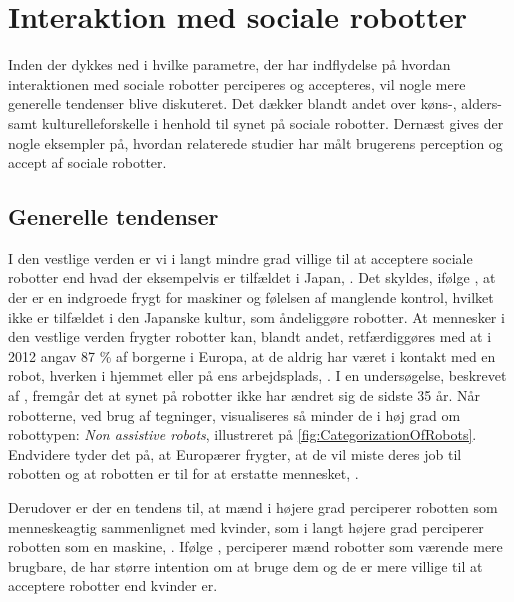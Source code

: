 \section{Interaktion med sociale robotter}
\label{InteraktionSocialeRobotter}
%
Inden der dykkes ned i hvilke parametre, der har indflydelse på hvordan interaktionen med sociale robotter perciperes og accepteres, vil nogle mere generelle tendenser blive diskuteret. Det dækker blandt andet over køns-, alders- samt kulturelleforskelle i henhold til synet på sociale robotter. Dernæst gives der nogle eksempler på, hvordan relaterede studier har målt brugerens perception og accept af sociale robotter.
%
\subsection{Generelle tendenser}
\label{InteraktionSocialeRobotterGenerelleTendenser}
%
I den vestlige verden er vi i langt mindre grad villige til at acceptere sociale robotter end hvad der eksempelvis er tilfældet i Japan, \parencite[s. 28]{PDF:InTheCompanyofRobots}. Det skyldes, ifølge \textcite[s. 28]{PDF:InTheCompanyofRobots}, at der er en indgroede frygt for maskiner og følelsen af manglende kontrol, hvilket ikke er tilfældet i den Japanske kultur, som åndeliggøre robotter. At mennesker i den vestlige verden frygter robotter kan, blandt andet, retfærdiggøres med at i 2012 angav 87 \% af borgerne i Europa, at de aldrig har været i kontakt med en robot, hverken i hjemmet eller på ens arbejdsplads, \parencite[s. 40]{PDF:PerceptionAcceptance}. I en undersøgelse, beskrevet af \textcite[s. 41]{PDF:PerceptionAcceptance}, fremgår det at synet på robotter ikke har ændret sig de sidste 35 år. Når robotterne, ved brug af tegninger, visualiseres så minder de i høj grad om robottypen: \textit{Non assistive robots}, illustreret på \autoref{fig:CategorizationOfRobots}. Endvidere tyder det på, at Europærer frygter, at de vil miste deres job til robotten og at robotten er til for at erstatte mennesket, \parencite[s. 22]{PDF:RobotShiftFromIPtoSR}.   

Derudover er der en tendens til, at mænd i højere grad perciperer robotten som menneskeagtig sammenlignet med kvinder, som i langt højere grad perciperer robotten som en maskine, \parencite[s. 28]{PDF:InTheCompanyofRobots}. Ifølge \textcite[s. 1479]{PDF:ExploringInfluencingVariable}, perciperer mænd robotter som værende mere brugbare, de har større intention om at bruge dem og de er mere villige til at acceptere robotter end kvinder er.  

